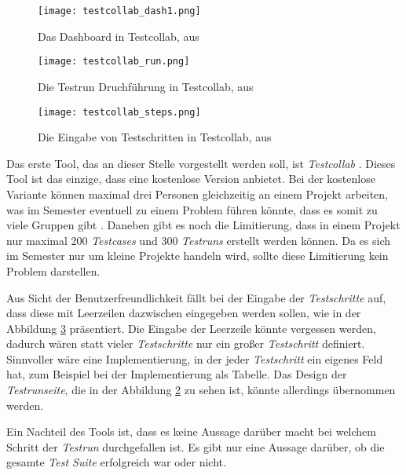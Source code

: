\documentclass[11pt,a4paper]{report}
\begin{document}

\begin{figure}[htpb]
  \centering
  \texttt{[image: testcollab\_dash1.png]}
  \caption{Das Dashboard in Testcollab, aus \cite{testcollab}}
  \label{f:testcollab-dash}
\end{figure}

\begin{figure}[htpb]
  \centering
  \texttt{[image: testcollab\_run.png]}
  \caption{Die Testrun Druchführung in Testcollab, aus \cite{testcollab}}
  \label{f:testcollab-testrun}
\end{figure}

\begin{figure}[htpb]
  \centering
  \texttt{[image: testcollab\_steps.png]}
  \caption{Die Eingabe von Testschritten in Testcollab, aus \cite{testcollab}}
  \label{f:testcollab-testschritt}
\end{figure}

Das erste Tool, das an dieser Stelle vorgestellt werden soll, ist \textit{Testcollab} \cite{testcollab}. Dieses Tool ist das einzige, dass eine kostenlose Version anbietet. Bei der kostenlose Variante können maximal drei Personen gleichzeitig an einem Projekt arbeiten, was im Semester eventuell zu einem Problem führen könnte, dass es somit zu viele Gruppen gibt \cite{testcollabprice}. Daneben gibt es noch die Limitierung, dass in einem Projekt nur maximal 200 \textit{Testcases} und 300 \textit{Testruns} erstellt werden können. Da es sich im Semester nur um kleine Projekte handeln wird, sollte diese Limitierung kein Problem darstellen.


Aus Sicht der Benutzerfreundlichkeit fällt bei der Eingabe der \textit{Testschritte} auf, dass diese mit Leerzeilen dazwischen eingegeben werden sollen, wie in der Abbildung \ref{f:testcollab-testschritt} präsentiert. Die Eingabe der Leerzeile könnte vergessen werden, dadurch wären statt vieler \textit{Testschritte} nur ein großer \textit{Testschritt} definiert. Sinnvoller wäre eine Implementierung, in der jeder \textit{Testschritt} ein eigenes Feld hat, zum Beispiel bei der Implementierung als Tabelle. Das Design der \textit{Testrunseite}, die in der Abbildung \ref{f:testcollab-testrun} zu sehen ist, könnte allerdings übernommen werden.

Ein Nachteil des Tools ist, dass es keine Aussage darüber macht bei welchem Schritt der \textit{Testrun} durchgefallen ist. Es gibt nur eine Aussage darüber, ob die gesamte \textit{Test Suite} erfolgreich war oder nicht.
\end{document}
